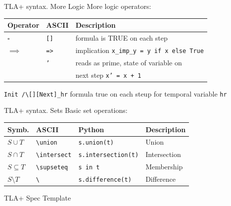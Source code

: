\documentclass[12pt]{beamer}
\begin{document}
  \begin{frame}{TLA+ syntax. More Logic}
      More logic operators:
        \begin{table}
        \centering
            \begin{tabular}{@{} llp{9cm} @{}}
                Operator    & ASCII       & Description   \\ \hline
                $\square$   & \texttt{[]} & formula is TRUE on each step  \\
                $\implies$  & \texttt{=>} & implication \texttt{x_imp_y = y if x else True}\\
                \boxed{$'$} & \texttt{'}  & reads as prime, state of variable on \\
                            &             & next step \texttt{x' = x + 1}\\
            \end{tabular}
        \end{table}
            \texttt{Init /\textbackslash [][Next]\_hr} formula true on each steup for temporal variable \texttt{hr}
  \end{frame}
  \begin{frame}{TLA+ syntax. Sets}
      Basic set operations:
        \begin{table}
        \centering
            \begin{tabular}{@{} lllp{7cm} @{}}
                Symb.           & ASCII                              & Python                                & Description   \\ \hline
                $S \cup T$      & \texttt{\textbackslash union}      &\texttt{s.union(t)}        & Union\\
                $S \cap T$      & \texttt{\textbackslash intersect}  &\texttt{s.intersection(t)} & Intersection \\
                $S \subseteq T$ & \texttt{\textbackslash supseteq}   &\texttt{s in t}            & Membership  \\
                $S \setminus T$ & \texttt{\textbackslash}            &\texttt{s.difference(t)}   & Difference \\
            \end{tabular}
        \end{table}
  \end{frame}
  \begin{frame}{TLA+ Spec Template}
      \begin{center}
          \inputminted[linenos, fontsize=\scriptsize]{tla}{figures/template.tla}
      \end{center}
  \end{frame}
\end{document}

